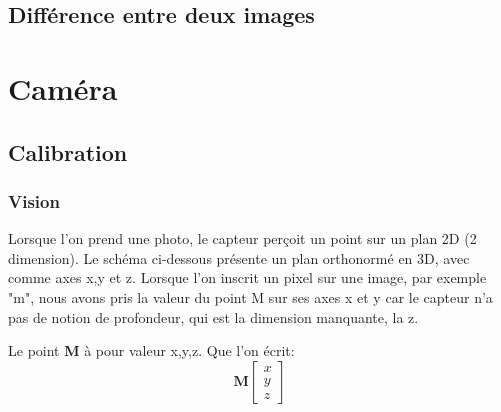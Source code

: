 \documentclass[12pt, french]{report}
\begin{document}
        \subsection{Différence entre deux images}

\section{Caméra}
\subsection{Calibration}
\subsubsection{Vision}
Lorsque l'on prend une photo, le capteur perçoit un point sur un plan 2D (2 dimension). Le schéma ci-dessous présente un plan orthonormé en 3D, avec comme axes x,y et z. Lorsque l'on inscrit un pixel sur une image, par exemple "m", nous avons pris la valeur du point M sur ses axes x et y car le capteur n'a pas de notion de profondeur, qui est la dimension manquante, la z.

\begin{center}
\end{center}

Le point \textbf{M} à pour valeur x,y,z. Que l'on écrit: $$\textbf{M}\begin{bmatrix}x\\y\\z\end{bmatrix}$$
\end{document}
